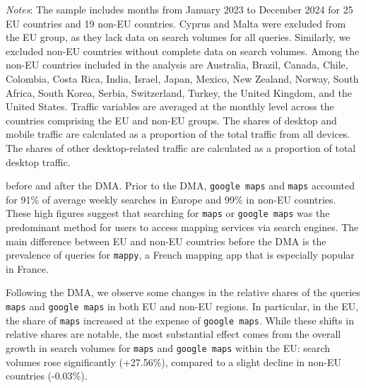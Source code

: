 \documentclass[11pt]{article}
\begin{document}
\begin{table}[!ht]
\begin{threeparttable}
			\begin{tablenotes}
				\item \footnotesize \emph{Notes}: The sample includes months from January 2023 to December 2024 for 25 EU countries and 19 non-EU countries. Cyprus and Malta were excluded from the EU group, as they lack data on search volumes for all queries. Similarly, we excluded non-EU countries without complete data on search volumes. Among the non-EU countries included in the analysis are Australia, Brazil, Canada, Chile, Colombia, Costa Rica, India, Israel, Japan, Mexico, New Zealand, Norway, South Africa, South Korea, Serbia, Switzerland, Turkey, the United Kingdom, and the United States. Traffic variables are averaged at the monthly level across the countries comprising the EU and non-EU groups. The shares of desktop and mobile traffic are calculated as a proportion of the total traffic from all devices. The shares of other desktop-related traffic are calculated as a proportion of total desktop traffic.  
			\end{tablenotes}
		\end{threeparttable}
	\end{table}
	
	\noindent before and after the DMA. Prior to the DMA, \texttt{google maps} and \texttt{maps} accounted for 91\% of average weekly searches in Europe and 99\% in non-EU countries. These high figures suggest that searching for \texttt{maps} or \texttt{google maps} was the predominant method for users to access mapping services via search engines. The main difference between EU and non-EU countries before the DMA is the prevalence of queries for \texttt{mappy}, a French mapping app that is especially popular in France. 
	
	Following the DMA, we observe some changes in the relative shares of the queries \texttt{maps} and \texttt{google maps} in both EU and non-EU regions. In particular, in the EU, the share of \texttt{maps} increased at the expense of \texttt{google maps}. While these shifts in relative shares are notable, the most substantial effect comes from the overall growth in search volumes for  \texttt{maps} and \texttt{google maps} within the EU: search volumes rose significantly (+27.56\%), compared to a slight decline in non-EU countries (-0.03\%).
	
\end{document}
